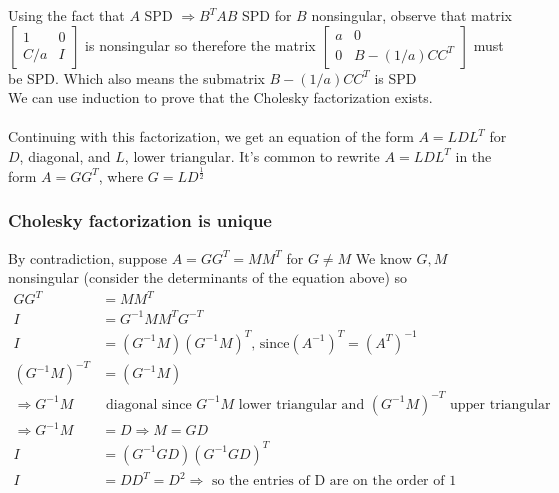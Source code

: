 \documentclass{article}
\begin{document}
\begin{itemize}
{\noindent Using the fact that $A$ SPD $\Rightarrow B^TAB$ SPD for $B$ nonsingular, observe that matrix $\begin{bmatrix} 1 & 0\\ C/a &  I\end{bmatrix}$ is nonsingular so therefore the matrix $\begin{bmatrix} a & 0\\ 0 & B - (1/a)CC^T \end{bmatrix}$ must be SPD. Which also means the submatrix $B - (1/a)CC^T$ is SPD \\
We can use induction to prove that the Cholesky factorization exists.
\\ \\
Continuing with this factorization, we get an equation of the form $A = LDL^T$ for $D$, diagonal, and $L$, lower triangular. It's common to rewrite $A = LDL^T$ in the form $A = GG^T$, where $G = LD^{\frac{1}{2}}$

\subsubsection{Cholesky factorization is unique}
By contradiction, suppose $A = GG^T = MM^T$ for $G \neq M$
We know $G, M$ nonsingular (consider the determinants of the equation above) so
\begin{align*}
    GG^T &= MM^T\\
    I &= G^{-1}MM^TG^{-T}\\
    I &= (G^{-1}M)(G^{-1}M)^T \textrm{, since} (A^{-1})^T = (A^T)^{-1}\\
    (G^{-1}M)^{-T} &= (G^{-1}M)\\ \Rightarrow G^{-1}M & \textrm{ diagonal since } G^{-1}M \textrm{ lower triangular and } (G^{-1}M)^{-T} \textrm{ upper triangular}\\
    \Rightarrow G^{-1}M &= D \Rightarrow M = GD\\
    I &= (G^{-1}GD)(G^{-1}GD)^T\\
    I &= DD^T = D^2 \Rightarrow \textrm{ so the entries of D are on the order of 1}
\end{align*}

}
\end{itemize}
\end{document}
